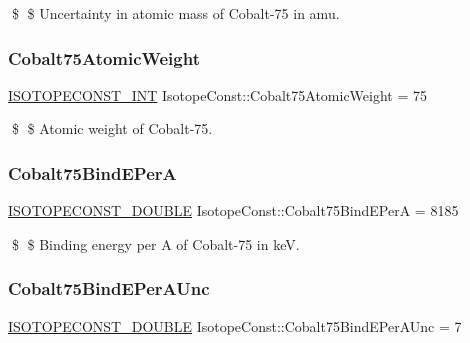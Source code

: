\$ \$ Uncertainty in atomic mass of Cobalt-\/75 in amu. \mbox{\label{group___isotope_const-_cobalt-_co75_ga9331dcfd087f6d15fc5f4c8b1ffca2f6}} 
\subsubsection{\texorpdfstring{Cobalt75\+Atomic\+Weight}{Cobalt75AtomicWeight}}
{\footnotesize\ttfamily \mbox{\hyperlink{group___isotope_const-_macros_ga5f18360b3e99483a35c32d789e62621c}{I\+S\+O\+T\+O\+P\+E\+C\+O\+N\+S\+T\+\_\+\+I\+NT}} Isotope\+Const\+::\+Cobalt75\+Atomic\+Weight = 75}

\$ \$ Atomic weight of Cobalt-\/75. \mbox{\label{group___isotope_const-_cobalt-_co75_gab35d2fd7229913c5aafa5cdcc346d636}} 
\subsubsection{\texorpdfstring{Cobalt75\+Bind\+E\+PerA}{Cobalt75BindEPerA}}
{\footnotesize\ttfamily \mbox{\hyperlink{group___isotope_const-_macros_ga8f45a7272ce02c0b4c65c44636ed719a}{I\+S\+O\+T\+O\+P\+E\+C\+O\+N\+S\+T\+\_\+\+D\+O\+U\+B\+LE}} Isotope\+Const\+::\+Cobalt75\+Bind\+E\+PerA = 8185}

\$ \$ Binding energy per A of Cobalt-\/75 in keV. \mbox{\label{group___isotope_const-_cobalt-_co75_gaad1aa030f696b090eaf97079f2bc37aa}} 
\subsubsection{\texorpdfstring{Cobalt75\+Bind\+E\+Per\+A\+Unc}{Cobalt75BindEPerAUnc}}
{\footnotesize\ttfamily \mbox{\hyperlink{group___isotope_const-_macros_ga8f45a7272ce02c0b4c65c44636ed719a}{I\+S\+O\+T\+O\+P\+E\+C\+O\+N\+S\+T\+\_\+\+D\+O\+U\+B\+LE}} Isotope\+Const\+::\+Cobalt75\+Bind\+E\+Per\+A\+Unc = 7}

